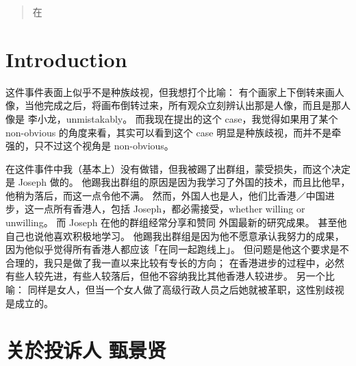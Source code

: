 \documentclass[orivec]{llncs}
\title{}
\author{\usebox{\MyName} (King-Yin Yan)
}
\institute{General.Intelligence@Gmail.com}
\date{\today}
\newcommand{\cc}[2]{#1}
\newcommand{\cc}[2]{#2}
\begin{document}
\let\labelitemi\labelitemii

\maketitle

\noindent
\makebox[\linewidth]{\small \today}

\setlength{\parskip}{2.8ex plus0.8ex minus0.8ex}

\begin{abstract}
\cc{
	在
}{
	An intelligent agent needs the ability to access its own knowledge, which comes for free in classical logic-based AI, but neural networks are notorious for the ``black-box'' problem.  The solution is to have the network act on its own weights.
}
\end{abstract}


\setcounter{section}{-1}
\section{Introduction}

这件事件表面上似乎不是种族歧视，但我想打个比喻： 有个画家上下倒转来画人像，当他完成之后，将画布倒转过来，所有观众立刻辨认出那是人像，而且是那人像是 李小龙，unmistakably。 而我现在提出的这个 case，我觉得如果用了某个 non-obvious 的角度来看，其实可以看到这个 case 明显是种族歧视，而并不是牵强的，只不过这个视角是 non-obvious。 

在这件事件中我（基本上）没有做错，但我被踢了出群组，蒙受损失，而这个决定是 Joseph 做的。  他踢我出群组的原因是因为我学习了外国的技术，而且比他早，他稍为落后，而这一点令他不满。  然而，外国人也是人，他们比香港／中国进步，这一点所有香港人，包括 Joseph，都必需接受，whether willing or unwilling。  而 Joseph 在他的群组经常分享和赞同 外国最新的研究成果。  甚至他自己也说他喜欢积极地学习。  他踢我出群组是因为他不愿意承认我努力的成果，因为他似乎觉得所有香港人都应该「在同一起跑线上」。  但问题是他这个要求是不合理的，我只是做了我一直以来比较有专长的方向； 在香港进步的过程中，必然有些人较先进，有些人较落后，但他不容纳我比其他香港人较进步。  另一个比喻： 同样是女人，但当一个女人做了高级行政人员之后她就被革职，这性别歧视是成立的。 


\section{关於投诉人 甄景贤}
\end{document}
